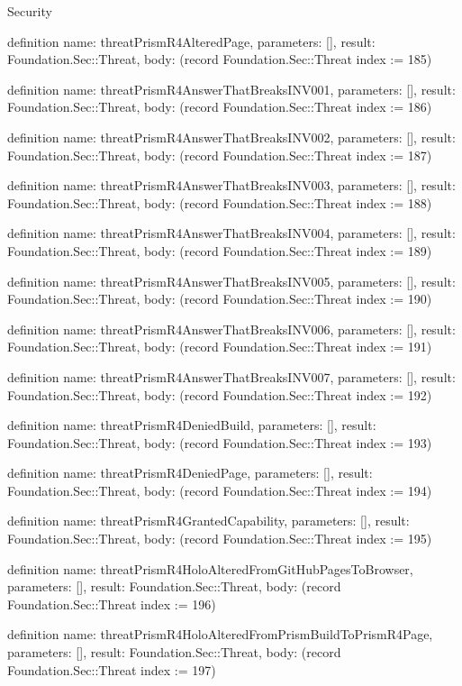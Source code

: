 \begin{lexlean}{Security}
\begin{semanticmodule}
definition{
  name: threatPrismR4AlteredPage,
  parameters: [],
  result: Foundation.Sec::Threat,
  body: (record Foundation.Sec::Threat {index := 185})
}

definition{
  name: threatPrismR4AnswerThatBreaksINV001,
  parameters: [],
  result: Foundation.Sec::Threat,
  body: (record Foundation.Sec::Threat {index := 186})
}

definition{
  name: threatPrismR4AnswerThatBreaksINV002,
  parameters: [],
  result: Foundation.Sec::Threat,
  body: (record Foundation.Sec::Threat {index := 187})
}

definition{
  name: threatPrismR4AnswerThatBreaksINV003,
  parameters: [],
  result: Foundation.Sec::Threat,
  body: (record Foundation.Sec::Threat {index := 188})
}

definition{
  name: threatPrismR4AnswerThatBreaksINV004,
  parameters: [],
  result: Foundation.Sec::Threat,
  body: (record Foundation.Sec::Threat {index := 189})
}

definition{
  name: threatPrismR4AnswerThatBreaksINV005,
  parameters: [],
  result: Foundation.Sec::Threat,
  body: (record Foundation.Sec::Threat {index := 190})
}

definition{
  name: threatPrismR4AnswerThatBreaksINV006,
  parameters: [],
  result: Foundation.Sec::Threat,
  body: (record Foundation.Sec::Threat {index := 191})
}

definition{
  name: threatPrismR4AnswerThatBreaksINV007,
  parameters: [],
  result: Foundation.Sec::Threat,
  body: (record Foundation.Sec::Threat {index := 192})
}

definition{
  name: threatPrismR4DeniedBuild,
  parameters: [],
  result: Foundation.Sec::Threat,
  body: (record Foundation.Sec::Threat {index := 193})
}

definition{
  name: threatPrismR4DeniedPage,
  parameters: [],
  result: Foundation.Sec::Threat,
  body: (record Foundation.Sec::Threat {index := 194})
}

definition{
  name: threatPrismR4GrantedCapability,
  parameters: [],
  result: Foundation.Sec::Threat,
  body: (record Foundation.Sec::Threat {index := 195})
}

definition{
  name: threatPrismR4HoloAlteredFromGitHubPagesToBrowser,
  parameters: [],
  result: Foundation.Sec::Threat,
  body: (record Foundation.Sec::Threat {index := 196})
}

definition{
  name: threatPrismR4HoloAlteredFromPrismBuildToPrismR4Page,
  parameters: [],
  result: Foundation.Sec::Threat,
  body: (record Foundation.Sec::Threat {index := 197})
}


\end{semanticmodule}
\end{lexlean}
